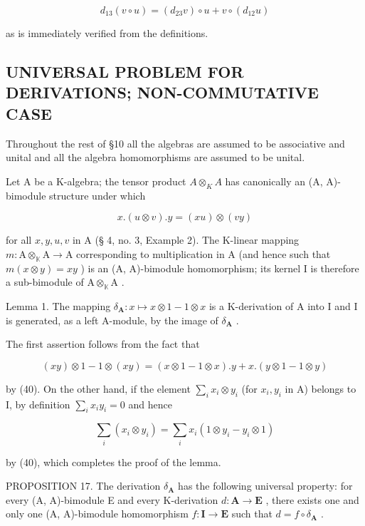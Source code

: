 \[
d _ {1 3} (v \circ u) = (d _ {2 3} v) \circ u + v \circ (d _ {1 2} u)\tag{39}
\]

as is immediately verified from the definitions.

\subsection{UNIVERSAL PROBLEM FOR DERIVATIONS; NON-COMMUTATIVE CASE}

Throughout the rest of §10 all the algebras are assumed to be associative and unital and all the algebra homomorphisms are assumed to be unital.

Let A be a K-algebra; the tensor product \(A \otimes_{K} A\) has canonically an (A, A)-bimodule structure under which

\[
x. (u \otimes v). y = (x u) \otimes (v y)\tag{40}
\]

for all \(x, y, u, v\) in A (§ 4, no. 3, Example 2). The K-linear mapping \(m: \mathrm{A} \otimes_{\mathbb{K}} \mathrm{A} \to \mathrm{A}\) corresponding to multiplication in A (and hence such that \(m(x \otimes y) = xy\) ) is an (A, A)-bimodule homomorphism; its kernel I is therefore a sub-bimodule of \(\mathrm{A} \otimes_{\mathbb{K}} \mathrm{A}\) .

Lemma 1. The mapping \(\delta_{\mathbf{A}}: x \mapsto x \otimes 1 - 1 \otimes x\) is a K-derivation of A into I and I is generated, as a left A-module, by the image of \(\delta_{\mathbf{A}}\) .

The first assertion follows from the fact that

\[
(x y) \otimes 1 - 1 \otimes (x y) = (x \otimes 1 - 1 \otimes x). y + x. (y \otimes 1 - 1 \otimes y)
\]

by (40). On the other hand, if the element \(\sum_{i} x_{i} \otimes y_{i}\) (for \(x_{i}, y_{i}\) in A) belongs to I, by definition \(\sum_{i} x_{i} y_{i} = 0\) and hence

\[
\sum_ {i} \left(x _ {i} \otimes y _ {i}\right) = \sum_ {i} x _ {i} (1 \otimes y _ {i} - y _ {i} \otimes 1)
\]

by (40), which completes the proof of the lemma.

PROPOSITION 17. The derivation \(\delta_{\mathbf{A}}\) has the following universal property: for every (A, A)-bimodule E and every K-derivation \(d: \mathbf{A} \to \mathbf{E}\) , there exists one and only one (A, A)-bimodule homomorphism \(f: \mathbf{I} \to \mathbf{E}\) such that \(d = f \circ \delta_{\mathbf{A}}\) .

